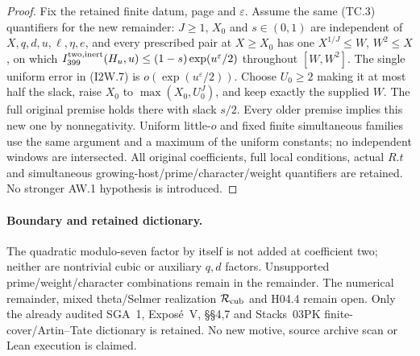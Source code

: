 \begin{proof}
Fix the retained finite datum, page and $\varepsilon$.
Assume the same (TC.3) quantifiers for the new remainder:
$J\geq1$, $X_0$ and $s\in(0,1)$ are independent of
$X,q,d,u,\ell,\eta,e$, and every prescribed pair at $X\geq X_0$
has one $X^{1/J}\leq W$, $W^2\leq X$, on which
$I_{399}^{\rm two,inert}(H_u,u)\leq(1-s)\exp(u^\varepsilon/2)$
throughout $[W,W^2]$.
The single uniform error in (I2W.7) is
$o(\exp(u^\varepsilon/2))$.
Choose $U_0\geq2$ making it at most half the slack, raise
$X_0$ to $\max(X_0,U_0^J)$, and keep exactly the supplied $W$.
The full original premise holds there with slack $s/2$.
Every older premise implies this new one by nonnegativity.
Uniform little-$o$ and fixed finite simultaneous families use
the same argument and a maximum of the uniform constants;
no independent windows are intersected.
All original coefficients, full local conditions, actual $R.t$
and simultaneous growing-host/prime/character/weight quantifiers
are retained.  No stronger AW.1 hypothesis is introduced.
\end{proof}

\paragraph{Boundary and retained dictionary.}
The quadratic modulo-seven factor by itself is not added at
coefficient two; neither are nontrivial cubic or auxiliary
$q,d$ factors.  Unsupported prime/weight/character combinations
remain in the remainder.
The numerical remainder, mixed theta/Selmer realization
$\mathcal R_{\rm cub}$ and H04.4 remain open.
Only the already audited SGA~1, Expos\'e~V, \S\S4,7 and
Stacks~03PK finite-cover/Artin--Tate dictionary is retained.
No new motive, source archive scan or Lean execution is claimed.
